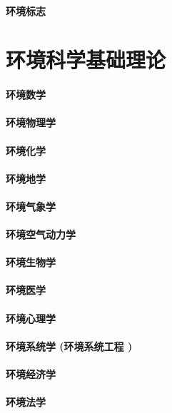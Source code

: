 \documentclass[UTF8]{../ApplicationUniverse}
\begin{document}
        \subsubsection{环境标志}





\chapter{环境科学基础理论}
\subsubsection{环境数学}
\subsubsection{环境物理学}
\subsubsection{环境化学}
\subsubsection{环境地学}
\subsubsection{环境气象学}
    \subsubsection{环境空气动力学}
\subsubsection{环境生物学}
\subsubsection{环境医学}
\subsubsection{环境心理学}
\subsubsection{环境系统学 (环境系统工程 )}
\subsubsection{环境经济学}
\subsubsection{环境法学}
\end{document}
